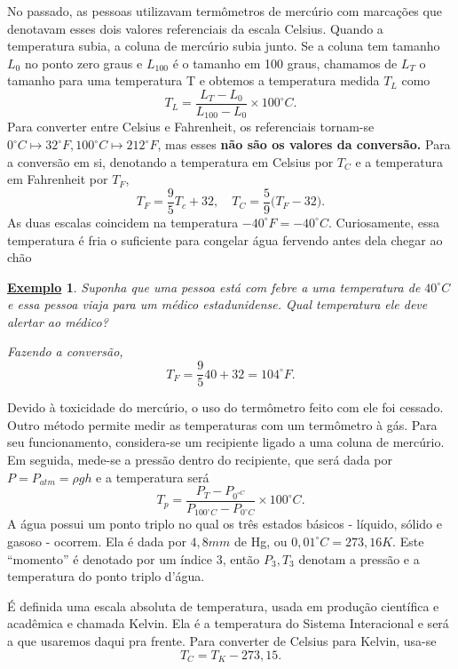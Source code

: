 \documentclass{article}
\newtheorem{example}{\underline{Exemplo}}
\begin{document}
No passado, as pessoas utilizavam termômetros de mercúrio com marcações que denotavam esses dois valores referenciais da escala Celsius. Quando a temperatura subia, a coluna
de mercúrio subia junto. Se a coluna tem tamanho \(L_{0}\) no ponto zero graus e \(L_{100}\) é o tamanho em 100 graus, chamamos de \(L_{T}\) o tamanho para uma temperatura T e obtemos a 
temperatura medida \(T_{L}\) como 
\[
  T_{L} = \frac{L_{T} - L_{0}}{L_{100}-L_{0}}\times 100^{\circ{}}C.
\]
Para converter entre Celsius e Fahrenheit, os referenciais tornam-se \(0^{\circ{}}C\mapsto 32^{\circ{}}F, 100^{\circ{}}C\mapsto 212^{\circ{}}F\), mas esses \textbf{não são os valores da conversão.}
Para a conversão em si, denotando a temperatura em Celsius por \(T_{C}\) e a temperatura em Fahrenheit por \(T_{F}\),
\[
  T_{F} = \frac{9}{5}T_{c} + 32,\quad T_{C} = \frac{5}{9}\biggl(T_{F}-32\biggr).
\]
As duas escalas coincidem na temperatura \(-40^{\circ{}}F = -40^{\circ{}}C\). Curiosamente, essa temperatura é fria o suficiente para congelar água fervendo antes dela chegar ao chão
\begin{example}
  Suponha que uma pessoa está com febre a uma temperatura de \(40^{\circ{}}C\) e essa pessoa viaja para um médico estadunidense. Qual temperatura ele deve alertar ao médico?

  Fazendo a conversão, 
  \[
    T_{F} = \frac{9}{5}40 +32 = 104^{\circ{}}F.
  \]
\end{example}
Devido à toxicidade do mercúrio, o uso do termômetro feito com ele foi cessado. Outro método permite medir as temperaturas com um termômetro à gás. Para seu funcionamento,
considera-se um recipiente ligado a uma coluna de mercúrio. Em seguida, mede-se a pressão dentro do recipiente, que será dada por \(P = P_{atm} = \rho gh\) e a temperatura será 
\[
  T_{p} = \frac{P_{T} - P_{0^{\circ{}C}}}{P_{100^{\circ{}}C}-P_{0^{\circ{}}C}}\times 100^{\circ{}}C.
\]
A água possui um ponto triplo no qual os três estados básicos - líquido, sólido e gasoso - ocorrem. Ela é dada por \(4,8mm\) de Hg, ou \(0,01^{\circ{}}C = 273,16K\). 
Este ``momento'' é denotado por um índice 3, então \(P_{3}, T_{3}\) denotam a pressão e a temperatura do ponto triplo d'água. 

É definida uma escala absoluta de temperatura, usada em produção científica e acadêmica e chamada Kelvin. Ela é a temperatura do Sistema Interacional e será a que usaremos
daqui pra frente. Para converter de Celsius para Kelvin, usa-se 
\[
  T_{C} = T_{K} - 273,15.
\]
\end{document}
